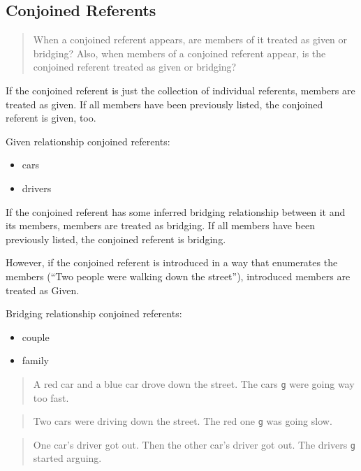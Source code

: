\documentclass[
]{book}
\providecommand{\tightlist}{%
  \setlength{\itemsep}{0pt}\setlength{\parskip}{0pt}}
\begin{document}
\hypertarget{conjoined-referents}{%
\subsection{Conjoined Referents}\label{conjoined-referents}}

\begin{quote}
When a conjoined referent appears, are members of it treated as given or bridging?
Also, when members of a conjoined referent appear, is the conjoined referent treated as given or bridging?
\end{quote}

If the conjoined referent is just the collection of individual referents, members are treated as given.
If all members have been previously listed, the conjoined referent is given, too.

Given relationship conjoined referents:

\begin{itemize}
\tightlist
\item
  cars
\item
  drivers
\end{itemize}

If the conjoined referent has some inferred bridging relationship between it and its members, members are treated as bridging.
If all members have been previously listed, the conjoined referent is bridging.

However, if the conjoined referent is introduced in a way that enumerates the members (``Two people were walking down the street''),
introduced members are treated as Given.

Bridging relationship conjoined referents:

\begin{itemize}
\tightlist
\item
  couple
\item
  family
\end{itemize}

\begin{quote}
A red car and a blue car drove down the street.
The cars \texttt{g} were going way too fast.
\end{quote}

\begin{quote}
Two cars were driving down the street.
The red one \texttt{g} was going slow.
\end{quote}

\begin{quote}
One car's driver got out.
Then the other car's driver got out.
The drivers \texttt{g} started arguing.
\end{quote}
\end{document}
